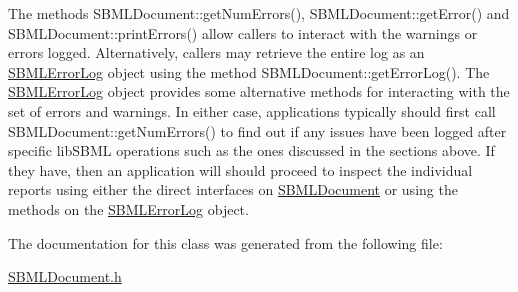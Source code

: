 The methods S\+B\+M\+L\+Document\+::get\+Num\+Errors(), S\+B\+M\+L\+Document\+::get\+Error() and S\+B\+M\+L\+Document\+::print\+Errors() allow callers to interact with the warnings or errors logged. Alternatively, callers may retrieve the entire log as an \hyperlink{class_s_b_m_l_error_log}{S\+B\+M\+L\+Error\+Log} object using the method S\+B\+M\+L\+Document\+::get\+Error\+Log(). The \hyperlink{class_s_b_m_l_error_log}{S\+B\+M\+L\+Error\+Log} object provides some alternative methods for interacting with the set of errors and warnings. In either case, applications typically should first call S\+B\+M\+L\+Document\+::get\+Num\+Errors() to find out if any issues have been logged after specific lib\+S\+B\+ML operations such as the ones discussed in the sections above. If they have, then an application will should proceed to inspect the individual reports using either the direct interfaces on \hyperlink{class_s_b_m_l_document}{S\+B\+M\+L\+Document} or using the methods on the \hyperlink{class_s_b_m_l_error_log}{S\+B\+M\+L\+Error\+Log} object. 

The documentation for this class was generated from the following file\+:\begin{DoxyCompactItemize}
\item 
\hyperlink{_s_b_m_l_document_8h}{S\+B\+M\+L\+Document.\+h}\end{DoxyCompactItemize}
